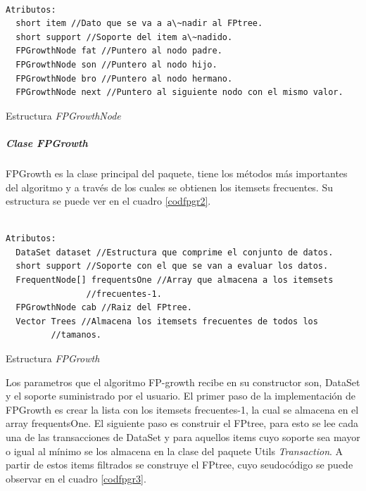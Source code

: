 \begin{codigof}[!h]
\begin{verbatim}

Atributos:
  short item //Dato que se va a a\~nadir al FPtree.
  short support //Soporte del item a\~nadido.
  FPGrowthNode fat //Puntero al nodo padre.
  FPGrowthNode son //Puntero al nodo hijo.
  FPGrowthNode bro //Puntero al nodo hermano.
  FPGrowthNode next //Puntero al siguiente nodo con el mismo valor.
\end{verbatim}
\caption{Estructura \textit{FPGrowthNode}}
\label{codfpgr1}
\end{codigof}

\subparagraph{Clase FPGrowth}
FPGrowth es la clase principal del paquete, tiene los m\'etodos m\'as importantes del algoritmo y a trav\'es
de los cuales se obtienen los itemsets frecuentes. Su estructura se puede ver en el cuadro \ref{codfpgr2}.\\

\begin{codigof}[ht]
\begin{verbatim}

Atributos:
  DataSet dataset //Estructura que comprime el conjunto de datos.
  short support //Soporte con el que se van a evaluar los datos.
  FrequentNode[] frequentsOne //Array que almacena a los itemsets 
  			    //frecuentes-1.
  FPGrowthNode cab //Raiz del FPtree.
  Vector Trees //Almacena los itemsets frecuentes de todos los 	
  	     //tamanos.
\end{verbatim}
\caption{Estructura \textit{FPGrowth}}
\label{codfpgr2}
\end{codigof}

Los parametros que el algoritmo FP-growth recibe en su constructor son, DataSet y el soporte suministrado por el
usuario. El primer paso de la implementaci\'on de FPGrowth es crear la lista con los itemsets frecuentes-1, la
cual se almacena en el array frequentsOne. El siguiente paso es construir el FPtree, para esto se lee cada una de
las transacciones de DataSet y para aquellos items cuyo soporte sea mayor o igual al m\'inimo se los almacena en
la clase del paquete Utils \textit{Transaction}. A partir de estos items filtrados se construye el FPtree, cuyo
seudoc\'odigo se puede observar en el cuadro \ref{codfpgr3}.\\

